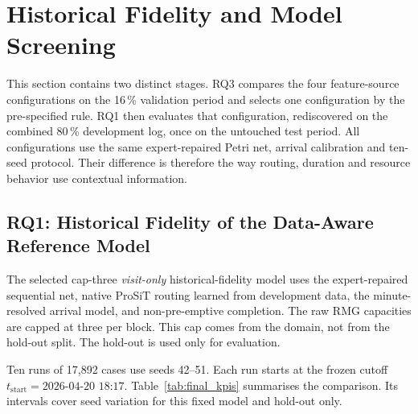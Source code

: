 \section{Historical Fidelity and Model Screening}
\label{sec:results_holdout_fidelity}

This section contains two distinct stages. RQ3 compares the four feature-source
configurations on the 16\,\% validation period and selects one configuration by
the pre-specified rule. RQ1 then evaluates that configuration, rediscovered on
the combined 80\,\% development log, once on the untouched test period. All
configurations use the same expert-repaired Petri net, arrival calibration and
ten-seed protocol. Their difference is therefore the way routing, duration and
resource behavior use contextual information.

\subsection{RQ1: Historical Fidelity of the Data-Aware Reference Model}

The selected cap-three \textit{visit-only} historical-fidelity model uses the
expert-repaired
sequential net, native ProSiT routing learned from development data, the
minute-resolved arrival model, and non-pre-emptive completion. The raw RMG
capacities are capped at three per block. This cap comes from the domain, not
from the hold-out split. The hold-out is used only for evaluation.

Ten runs of 17,892 cases use seeds 42--51. Each run starts at the frozen cutoff
$t_{\text{start}}=\text{2026-04-20 18:17}$. Table~\ref{tab:final_kpis}
summarises the comparison. Its intervals cover seed variation for this fixed
model and hold-out only.

